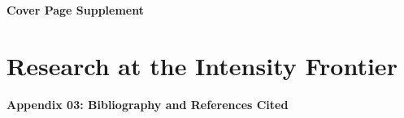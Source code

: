 \documentclass[11pt,english]{article}
\def\overhead#1{\part{#1}}
\def\centerhead#1{
	\begin{center}
	\Large\textbf{#1}
	\end{center}}
\begin{document}
\pagestyle{empty}
\baselineskip=23pt
\normalsize

\noindent

%


\newpage

\centerhead{Cover Page Supplement}

\newpage

\pagestyle{plain}
\setcounter{page}{1}

\overhead{Research at the Intensity Frontier}





\newpage

\newpage




%


\newpage




%





\newpage
\centerhead{Appendix 03:  Bibliography and References Cited}
\end{document}
